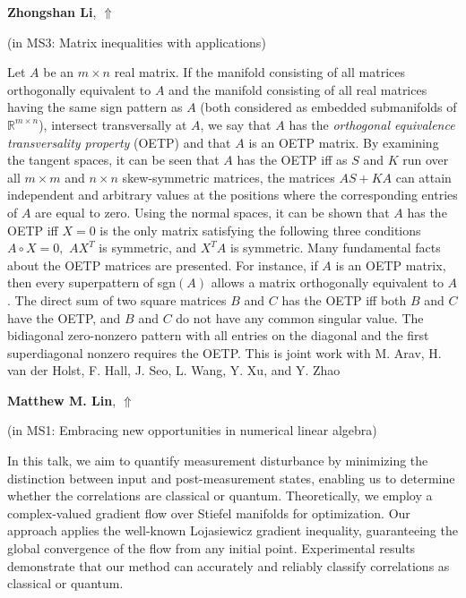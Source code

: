 \documentclass[ILAS2025-program.tex]{subfiles}
\begin{document}
\hypertarget{down0267}{}\begin{ilasabstract}
    
\textbf{Zhongshan Li},  \hfill \hyperlink{up0267}{$\Uparrow$}
    
    
(in {\color{mstitle}MS3: Matrix inequalities with applications})
        
\mtskip
    Let $A$ be an  $m\times n$ real matrix. If the  manifold  consisting of all matrices orthogonally equivalent to $A$ and the manifold consisting of all real matrices having the same sign pattern as $A$ (both considered as embedded submanifolds of $\mathbb R^{m \times n}$),  intersect transversally at $A$, we say that $A$ has the \emph{orthogonal equivalence transversality property} (OETP) and that $A$ is an OETP matrix. By examining the tangent spaces, it can be seen that $A$ has the OETP iff as $S$ and $K$ run over all $m\times m$ and $n\times n$ skew-symmetric matrices, the matrices $AS + KA$ can attain independent and arbitrary values at the positions where the corresponding entries of $A$ are equal to  zero.  Using the normal spaces, it can be shown that $A$ has the OETP iff $X=0$ is the only matrix satisfying the following three conditions $A\circ X=0,$ $AX^T$ is symmetric, and $X^TA$ is symmetric. Many fundamental facts about the OETP matrices are presented. For instance, if $A$ is an OETP matrix, then every superpattern of sgn$(A)$ allows a matrix orthogonally equivalent  to $A$. The direct sum of two square matrices $B$ and $C$ has the OETP iff both $B$ and $C$ have the OETP, and $B$ and $C$ do not have any common singular value.        
The bidiagonal  zero-nonzero pattern with all entries on the diagonal and  the first superdiagonal nonzero requires the OETP.  
This is joint work with M. Arav, H. van der Holst, F. Hall, J. Seo, L. Wang, Y. Xu, and  Y. Zhao
\end{ilasabstract}
    

\hypertarget{down0071}{}\begin{ilasabstract}
    
\textbf{Matthew M. Lin},  \hfill \hyperlink{up0071}{$\Uparrow$}
    
    
(in {\color{mstitle}MS1: Embracing new opportunities in numerical linear algebra})
        
\mtskip
    In this talk, we aim to quantify measurement disturbance by minimizing the distinction between input and post-measurement states, enabling us to determine whether the correlations are classical or quantum. Theoretically, we employ a complex-valued gradient flow over Stiefel manifolds for optimization. Our approach applies the well-known Lojasiewicz gradient inequality, guaranteeing the global convergence of the flow from any initial point. Experimental results
demonstrate that our method can accurately and reliably classify correlations as classical or quantum.

\end{ilasabstract}
    
\end{document}

